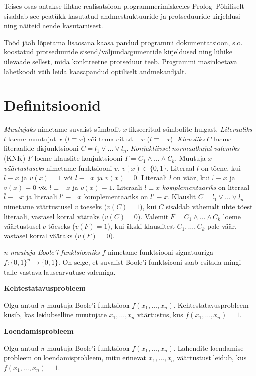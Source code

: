 Teises osas antakse lihtne realisatsioon
programmerimiskeeles Prolog. Põhiliselt sisaldab see peatükk kasutatud
andmestruktuuride ja protseduuride kirjeldusi ning näiteid nende kasutamisest.

Tööd jääb lõpetama lisaosana kaasa pandud programmi dokumentatsioon, s.o.
koostatud protseduuride sisend/väljundargumentide kirjeldused ning lühike
ülevaade sellest, mida konktreetne protseduur teeb. Programmi masinloetava
lähetkoodi võib leida kaasapandud optiliselt andmekandjalt.

\section*{Definitsioonid}

\emph{Muutujaks} nimetame suvalist sümbolit $x$
fikseeritud sümbolite hulgast. \emph{Literaaliks} $l$ loeme muutujat $x$ ($l\equiv x$) või tema
eitust $-x$ ($l\equiv-x$). \emph{Klausliks} $C$ loeme literaalide disjunktsiooni
$C=l_{1}\vee\dots\vee l_{n}$. \emph{Konjuktiivsel normaalkujul valemiks} (KNK)
$F$ loeme klauslite konjuktsiooni $F=C_{1}\wedge\dots\wedge C_{k}$. Muutuja
$x$ \emph{väärtustuseks} nimetame funktsiooni $v$, $v(x)\in\{0,1\}$. Literaal
$l$ on tõene, kui $l\equiv x$ ja $v(x)=1$ või $l\equiv\neg x$
ja $v(x)=0$. Literaali $l$ on väär, kui $l\equiv x$ ja $v(x)=0$
või $l\equiv-x$ ja $v(x)=1$. Literaali $l\equiv x$ \emph{komplementaariks}
on literaal $\bar{l}\equiv\neg x$ ja literaali $l'\equiv\neg x$ komplementaariks
on $\bar{l'}\equiv x$. Klauslit $C=l_{1}\vee\dots\vee l_{n}$
nimetame väärtustusel $v$ tõeseks ($v(C)=1$), kui $C$ sisaldab
vähemalt ühte tõest literaali, vastasel korral vääraks ($v(C)=0$).
Valemit $F=C_{1}\wedge\dots\wedge C_{k}$ loeme väärtustusel $v$ tõeseks
($v(F)=1$), kui ükski klauslitest $C_{1},\dots,C_{k}$ pole väär, vastasel
korral vääraks ($v(F)=0$).

\emph{n-muutuja Boole'i funktsiooniks} $f$ nimetame
funktsiooni signatuuriga \mbox{$f:\{0,1\}^n\to \{0,1\}$}. On selge, et suvalist
Boole'i funktsiooni saab esitada mingi talle vastava lausearvutuse valemiga.

\textbf{Kehtestatavusprobleem}

Olgu antud $n$-muutuja Boole'i funktsioon $f(x_1,\dots,x_n)$.
Kehtestatavusprobleem küsib, kas leidub\footnotemark[1] selline muutujate
$x_1,\dots,x_n$ väärtustus, kus $f(x_1,\dots,x_n)=1$.

\textbf{Loendamisprobleem}

Olgu antud $n$-muutuja Boole'i funktsioon $f(x_1,\dots,x_n)$. Lahendite
loendamise probleem on loendamisprobleem, mitu erinevat $x_1,\dots,x_n$
väärtustust leidub, kus $f(x_1,\dots,x_n)=1$.

